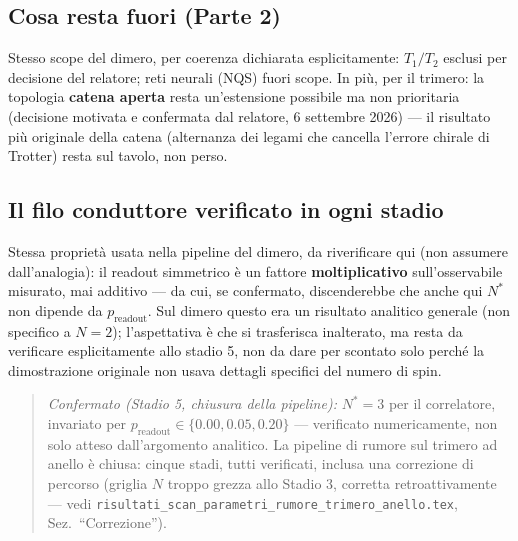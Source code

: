 \documentclass[11pt,a4paper]{article}
\begin{document}
\subsection{Cosa resta fuori (Parte 2)}

Stesso scope del dimero, per coerenza dichiarata esplicitamente:
$T_1/T_2$ esclusi per decisione del relatore; reti neurali (NQS) fuori
scope. In più, per il trimero: la topologia \textbf{catena aperta}
resta un'estensione possibile ma non prioritaria (decisione motivata e
confermata dal relatore, 6 settembre 2026) --- il risultato più
originale della catena (alternanza dei legami che cancella l'errore
chirale di Trotter) resta sul tavolo, non perso.

\subsection{Il filo conduttore verificato in ogni stadio}

Stessa proprietà usata nella pipeline del dimero, da riverificare qui
(non assumere dall'analogia): il readout simmetrico è un fattore
\textbf{moltiplicativo} sull'osservabile misurato, mai additivo --- da
cui, se confermato, discenderebbe che anche qui $N^*$ non dipende da
$p_\text{readout}$. Sul dimero questo era un risultato analitico
generale (non specifico a $N=2$); l'aspettativa è che si trasferisca
inalterato, ma resta da verificare esplicitamente allo stadio 5, non da
dare per scontato solo perché la dimostrazione originale non usava
dettagli specifici del numero di spin.

\begin{quote}
\textit{Confermato (Stadio 5, chiusura della pipeline):} $N^*=3$ per il
correlatore, invariato per $p_\text{readout}\in\{0.00, 0.05, 0.20\}$
--- verificato numericamente, non solo atteso dall'argomento analitico.
La pipeline di rumore sul trimero ad anello è chiusa: cinque stadi,
tutti verificati, inclusa una correzione di percorso (griglia $N$ troppo
grezza allo Stadio 3, corretta retroattivamente --- vedi
\texttt{risultati\_\allowbreak scan\_\allowbreak parametri\_rumore\_trimero\_anello.tex},
Sez.\ ``Correzione'').
\end{quote}
\end{document}
